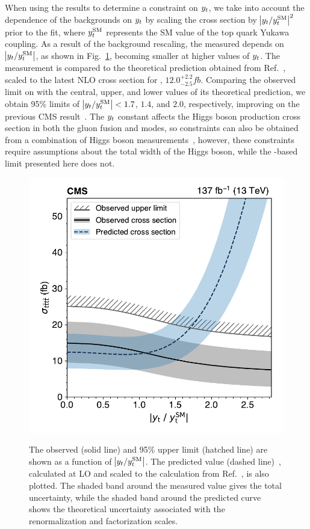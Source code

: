 When using the \tttt results to determine a constraint on $y_{t}$, we take
into account the dependence of the backgrounds on $y_{t}$ by scaling the
\ttH cross section by $\abs{y_{t}/y_{t}^{\mathrm{SM}}}^2$ prior to the
fit, where $y_{t}^{\mathrm{SM}}$ represents the SM value of the top quark
Yukawa coupling. As a result of the \ttH background rescaling, the measured
\xsectttt depends on $\abs{y_{t}/y_{t}^{\mathrm{SM}}}$, as shown in
Fig.~\ref{fig:yukawa}, becoming smaller at higher values of $y_{t}$. The
measurement is compared to the theoretical prediction obtained from
Ref.~\cite{THEORY:TopYukawaTTTT}, scaled to the latest NLO cross section for
\tttt, $12.0^{+2.2}_{-2.5}\unit{fb}$. Comparing the observed limit on
\xsectttt with the central, upper, and lower values of its theoretical
prediction, we obtain 95\% \CL limits of
$\abs{y_{t}/y_{t}^{\mathrm{SM}}} < 1.7$, $1.4$, and $2.0$,
respectively, improving on the previous CMS \tttt
result~\cite{CMS:myTOP2016}. The $y_{t}$ constant affects the Higgs boson
production cross section in both the gluon fusion and \ttH modes, so
constraints can also be obtained from a combination of Higgs boson
measurements~\cite{STAT:AtlasCmsHiggsComb}, however, these constraints
require assumptions about the total width of the Higgs boson, while the
\tttt-based limit presented here does not.

\begin{figure}[!hbtp]
\centering
\includegraphics[width=.70\textwidth]{figs/ftp/yukawa.pdf}
\\
\caption{
    The observed \xsectttt (solid line) and 95\% \CL upper limit (hatched line) are shown as a function
    of $\abs{y_{t}/y_{t}^{\mathrm{SM}}}$. The predicted value (dashed line)~\cite{THEORY:TopYukawaTTTT},
    calculated at LO and scaled to the calculation from Ref.~\cite{THEORY:Frederix2017wme}, is also plotted.
    The shaded band around the measured value gives the total uncertainty, while the shaded band around
    the predicted curve shows the theoretical uncertainty associated with the renormalization and
    factorization scales.
}
\label{fig:yukawa}
\end{figure}


